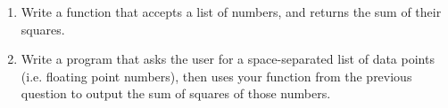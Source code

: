 \begin{enumerate}

	\item Write a function that accepts a list of numbers, and returns    the sum of their squares.
	\item Write a program that asks the user for a space-separated list    of data points (i.e. floating point numbers), then uses your    function from the previous question to output the sum of squares of    those numbers.



\end{enumerate}    
